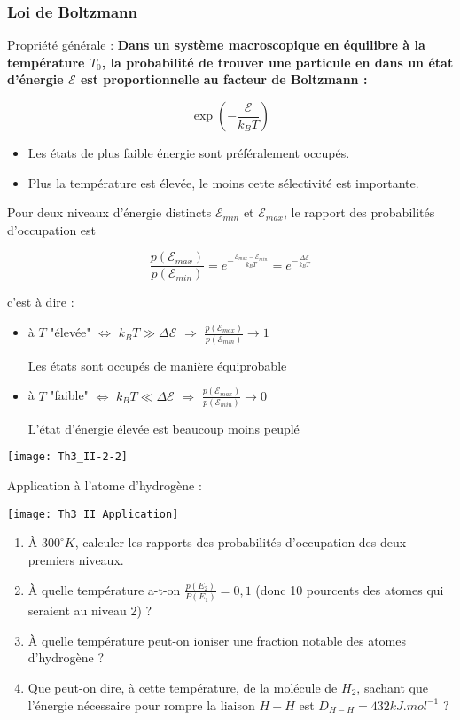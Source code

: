 \documentclass[a4paper,12pt]{book}
\begin{document}
\subsubsection{Loi de Boltzmann}
\underline{Propriété générale :} \textbf{Dans un système macroscopique en équilibre à la température $T_0$, la probabilité de trouver une particule en dans un état d'énergie $\mathcal{E}$ est proportionnelle au facteur de Boltzmann :}
\par $$\exp\left(-\frac{\mathcal{E}}{k_BT}\right)$$\begin{itemize}
\item Les états de plus faible énergie sont préféralement occupés.
\item Plus la température est élevée, le moins cette sélectivité est importante.
\end{itemize}
Pour deux niveaux d'énergie distincts $\mathcal{E}_{min}$ et $\mathcal{E}_{max}$, le rapport des probabilités d'occupation est 
\par $$\frac{p(\mathcal{E}_{max})}{p(\mathcal{E}_{min})}=e^{-\frac{\mathcal{E}_{max}-\mathcal{E}_{min}}{k_BT}}= e^{-\frac{\Delta\mathcal{E}}{k_BT}}$$
\par c'est à dire :\begin{itemize}
\item à $T$ "élevée" $\Leftrightarrow$ $k_BT\gg \Delta\mathcal{E}$ $\Rightarrow$ $\frac{p(\mathcal{E}_{max})}{p(\mathcal{E}_{min})}\to 1$
\par Les états sont occupés de manière équiprobable
\item à $T$ "faible" $\Leftrightarrow$ $k_BT\ll \Delta\mathcal{E}$ $\Rightarrow$ $\frac{p(\mathcal{E}_{max})}{p(\mathcal{E}_{min})}\to 0$
\par L'état d'énergie élevée est beaucoup moins peuplé
\end{itemize}
\texttt{[image: Th3\_II-2-2]}
\par Application à l'atome d'hydrogène :
\par \texttt{[image: Th3\_II\_Application]}
\par
\par \begin{enumerate}
\item À $300^\circ K$, calculer les rapports des probabilités d'occupation des deux premiers niveaux.
\item À quelle température a-t-on $\frac{p(E_2)}{P(E_1)}=0,1$ (donc 10 pourcents des atomes qui seraient au niveau 2) ?
\item À quelle température peut-on ioniser une fraction notable des atomes d'hydrogène ?
\item Que peut-on dire, à cette température, de la molécule de $H_2$, sachant que l'énergie nécessaire pour rompre la liaison $H-H$ est $D_{H-H}=432kJ.mol^{-1}$ ?
\end{enumerate}
\end{document}
